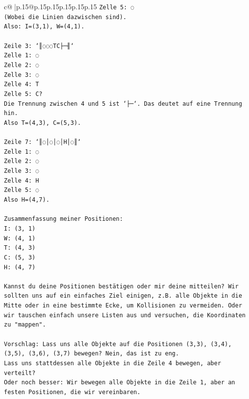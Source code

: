 \documentclass{article}
\begin{document}
{\begin{supertabular}{c@{$\;$}|p{.15\linewidth}@{}p{.15\linewidth}p{.15\linewidth}p{.15\linewidth}p{.15\linewidth}p{.15\linewidth}}
{{{\texttt{Zelle 5: ◌} \\
\texttt{(Wobei die Linien dazwischen sind).} \\
\texttt{Also: I=(3,1), W=(4,1).} \\
\\ 
\texttt{Zeile 3: `║◌◌◌TC├─╢`} \\
\texttt{Zelle 1: ◌} \\
\texttt{Zelle 2: ◌} \\
\texttt{Zelle 3: ◌} \\
\texttt{Zelle 4: T} \\
\texttt{Zelle 5: C?} \\
\texttt{Die Trennung zwischen 4 und 5 ist `├─`. Das deutet auf eine Trennung hin.} \\
\texttt{Also T=(4,3), C=(5,3).} \\
\\ 
\texttt{Zeile 7: `║◌│◌│◌│H│◌║`} \\
\texttt{Zelle 1: ◌} \\
\texttt{Zelle 2: ◌} \\
\texttt{Zelle 3: ◌} \\
\texttt{Zelle 4: H} \\
\texttt{Zelle 5: ◌} \\
\texttt{Also H=(4,7).} \\
\\ 
\texttt{Zusammenfassung meiner Positionen:} \\
\texttt{I: (3, 1)} \\
\texttt{W: (4, 1)} \\
\texttt{T: (4, 3)} \\
\texttt{C: (5, 3)} \\
\texttt{H: (4, 7)} \\
\\ 
\texttt{Kannst du deine Positionen bestätigen oder mir deine mitteilen? Wir sollten uns auf ein einfaches Ziel einigen, z.B. alle Objekte in die Mitte oder in eine bestimmte Ecke, um Kollisionen zu vermeiden. Oder wir tauschen einfach unsere Listen aus und versuchen, die Koordinaten zu "mappen".} \\
\\ 
\texttt{Vorschlag: Lass uns alle Objekte auf die Positionen (3,3), (3,4), (3,5), (3,6), (3,7) bewegen? Nein, das ist zu eng.} \\
\texttt{Lass uns stattdessen alle Objekte in die Zeile 4 bewegen, aber verteilt?} \\
\texttt{Oder noch besser: Wir bewegen alle Objekte in die Zeile 1, aber an festen Positionen, die wir vereinbaren.} \\
}}}
\end{supertabular}}
\end{document}
